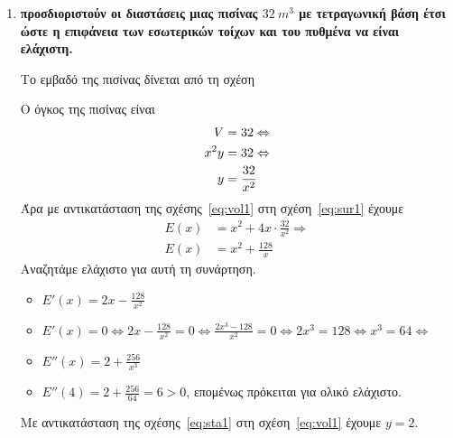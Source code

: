



\everymath{\displaystyle}



\begin{center}
\end{center}

\vspace{\baselineskip}

\begin{enumerate}

	\item {\bfseries {} προσδιοριστούν οι διαστάσεις μιας πισίνας $ \SI{32}{m^{3}} $ με
			τετραγωνική βάση έτσι ώστε η επιφάνεια των εσωτερικών τοίχων και του
		πυθμένα να είναι ελάχιστη.}


		Το εμβαδό της πισίνας δίνεται από τη σχέση

		Ο όγκος της πισίνας είναι 
		\begin{align}
			V &= 32 \notag \Leftrightarrow \\
			x^{2}y &= 32 \notag \Leftrightarrow \\
			y &= \frac{32}{x^{2}} \label{eq:vol1} 
		\end{align}
		Άρα με αντικατάσταση της σχέσης~\eqref{eq:vol1} στη
		σχέση~\eqref{eq:sur1} έχουμε
		\begin{align*}
			E(x) &= x^{2} + 4x\cdot \frac{32}{x^{2}} \Rightarrow \\
			E(x) &= x^{2} +	\frac{128}{x}
		\end{align*}
		Αναζητάμε ελάχιστο για αυτή τη συνάρτηση.
		\begin{itemize}
			\item $ E'(x) = 2x - \frac{128}{x^{2}} $ 
			\item $ E'(x) = 0 \Leftrightarrow 2x - \frac{128}{x^{2}} = 0
				\Leftrightarrow \frac{2x^{3} - 128}{x^{2}} = 0 \Leftrightarrow
				2x^{3} = 128 \Leftrightarrow x^{3} = 64 \Leftrightarrow$
			\item $ E''(x) = 2 + \frac{256}{x^{3}} $
			\item $ E''(4) = 2 + \frac{256}{64} = 6 > 0 $, επομένως πρόκειται για
				ολικό ελάχιστο.
		\end{itemize}
		Με αντικατάσταση της σχέσης~\eqref{eq:sta1} στη σχέση~\eqref{eq:vol1} έχουμε $ y = 2 $.


\end{enumerate}
